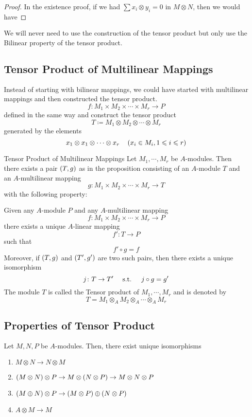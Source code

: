 \begin{proof}
	In the existence proof, if we had \(\sum x_i \otimes y_i = 0\)
	in \(M \otimes N\), then we would have
\end{proof}

We will never need to use the construction of the tensor product but
only use the Bilinear property of the tensor product.


\subsection{Tensor Product of Multilinear Mappings}

Instead of starting with bilinear mappings, we could have started with
multilinear mappings and then constructed the tensor product.
\[
	f \colon M_1 \times M_2 \times \cdots \times M_r \to P
\]
defined in the same way and construct the tensor product
\[
	T \coloneqq M_1 \otimes M_2 \otimes \cdots \otimes M_r
\]
generated by the elements
\[
	x_1 \otimes x_1 \otimes \cdots \otimes x_r
	\quad \left( x_i \in M_i, 1 \leqslant i \leqslant r \right)
\]


\begin{defn}{Tensor Product of Multilinear Mappings}{}
	Let \(M_1, \cdots, M_r\) be \(A\)-modules.
	Then there exists a pair \(\left( T, g \right)\) as in the proposition
	consisting of an \(A\)-module \(T\) and an \(A\)-multilinear mapping
	\[
		g \colon M_1 \times M_2 \times \cdots \times M_r \to T
	\]
	with the following property:

	Given any \(A\)-module \(P\) and any \(A\)-multilinear mapping
	\[
		f \colon M_1 \times M_2 \times \cdots \times M_r \to P
	\]
	there exists a unique \(A\)-linear mapping
	\[
		f' \colon T \to P
	\]
	such that
	\[
		f' \circ g = f
	\]
	Moreover, if \(\left( T, g \right)\) and \(\left( T', g' \right)\) are two such
	pairs, then there exists a unique isomorphism
	\[
		j \colon T \to T' \quad \text{ s.t. } \quad j \circ g = g'
	\]
	The module \(T\) is called the Tensor product of \(M_1, \cdots, M_r\)
	and is denoted by
	\[
		T = M_1 \otimes_A M_2 \otimes_A \cdots \otimes_A M_r
	\]
\end{defn}


\subsection{Properties of Tensor Product}

\begin{proposition}{}{}
	Let \(M, N, P\) be \(A\)-modules.
	Then, there exist unique isomorphisms
	\begin{enumerate}
		\item \(M \otimes N \to N \otimes M\)
		\item \(\left( M \otimes N \right) \otimes P \to M \otimes (N \otimes P)
			\to M \otimes N \otimes P\)
		\item \(\left( M \oplus N \right) \otimes P \to \left( M \otimes P \right)
			\oplus \left( N \otimes P \right)\)
		\item \(A \otimes M \to M\)
	\end{enumerate}
\end{proposition}

